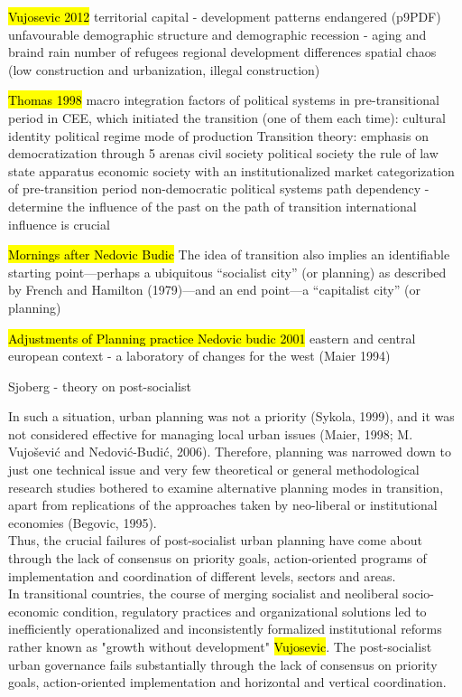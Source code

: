 \documentclass[11pt]{report}
\begin{document}
\hl{Vujosevic 2012}
territorial capital - development patterns endangered  (p9PDF)
    unfavourable demographic structure and demographic recession - aging and braind rain
    number of refugees
    regional development differences
    spatial chaos (low construction and urbanization, illegal construction)

\hl{Thomas 1998}
macro integration factors of political systems in pre-transitional period in CEE, which initiated the transition (one of them each time):
    cultural identity
    political regime
    mode of production
Transition theory:
    emphasis on democratization through 5 arenas
        civil society
        political society
        the rule of law
        state apparatus
        economic society with an institutionalized market
    categorization of pre-transition period
        non-democratic political systems
    path dependency - determine the influence of the past on the path of transition
    international influence is crucial

\hl{Mornings after Nedovic Budic}
The idea of transition also implies an identiﬁable starting point—perhaps a ubiquitous “socialist city” (or planning) as described by French and Hamilton (1979)—and an end point—a “capitalist city” (or planning)

\hl{Adjustments of Planning practice Nedovic budic 2001}
eastern and central european context - a laboratory of changes for the west (Maier 1994)

Sjoberg - theory on post-socialist

In such a situation, urban planning was not a priority (Sykola, 1999), and it was not considered effective for managing local urban issues (Maier, 1998; M. Vujošević and Nedović-Budić, 2006). Therefore, planning was narrowed down to just one technical issue and very few theoretical or general methodological research studies bothered to examine alternative planning modes in transition, apart from replications of the approaches taken by neo-liberal or institutional economies (Begovic, 1995).
\\
Thus, the crucial failures of post-socialist urban planning have come about through the lack of consensus on priority goals, action-oriented programs of implementation and coordination of different levels, sectors and areas. 
\\
In transitional countries, the course of merging socialist and neoliberal socio-economic condition, regulatory practices and organizational solutions led to inefficiently operationalized and inconsistently formalized institutional reforms rather known as "growth without development" \hl{Vujosevic}.
The post-socialist urban governance fails substantially through the lack of consensus on priority goals, action-oriented implementation and horizontal and vertical coordination.
\\
\end{document}
